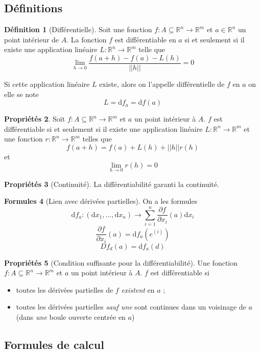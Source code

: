 \documentclass[11pt,a4paper]{article}
\theoremstyle{definition}
\newtheorem{mydef}{Définition}[section]
\newtheorem{myprop}[mydef]{Propriétés}
\newtheorem{myform}[mydef]{Formules}
\newcommand{\R}{\mathbb{R}}
\newcommand{\dif}{\mathrm{d}}
\newcommand{\fl}{\rightarrow}
\newcommand{\pa}{\partial}
\begin{document}
\subsection{Définitions}

\begin{mydef}[Différentielle] Soit une fonction $f : A \subseteq \R^n \fl \R^m$ et $a \in \R^n$ un point intérieur de $A$. La fonction $f$ est différentiable en $a$ si et seulement si il existe une application linéaire $L : \R^n \fl \R^m$ telle que
\[ \lim_{h \fl 0} \frac{f(a+h) - f(a) - L(h)}{||h||} = 0 \]

Si cette application linéaire $L$ existe, alors on l'appelle différentielle de $f$ en $a$ on elle se note
\[ L = \dif f_a = \dif f(a) \]
\end{mydef}

\begin{myprop} Soit $f : A \subseteq \R^n \fl \R^m$ et $a$ un point intérieur à $A$. $f$ est différentiable si et seulement si il existe une application linéaire $L : \R^n \fl \R^m$ et une fonction $r : \R^n \fl \R^m$ telles que
\[ f(a+h) = f(a) + L(h) + ||h|| r(h) \]
et
\[ \lim_{h \fl 0}r(h) = 0 \]
\end{myprop}

\begin{myprop}[Continuité] La différentiabilité garanti la continuité. \end{myprop}

\begin{myform}[Lien avec dérivées partielles] On a les formules
\[ \dif f_a : (\dif x_1 , \dots , \dif x_n) \fl \sum_{i=1}^n \frac{\pa f}{\pa x_i}(a) \dif x_i \]
\[ \frac{\pa f}{\pa x_i}(a) = \dif f_a(e^{(i)}) \]
\[ Df_d(a) = \dif f_a(d) \]
\end{myform}

\begin{myprop}[Condition suffisante pour la différentiabilité] Une fonction $f : A \subseteq \R^n \fl \R^m$ et $a$ un point intérieur à $A$. $f$ est différentiable si
\begin{itemize}
\item toutes les dérivées partielles de $f$ \emph{existent} en $a$ ;
\item toutes les dérivées partielles \emph{sauf une} sont continues dans un voisinage de $a$ (dans \emph{une} boule ouverte centrée en $a$)
\end{itemize}
\end{myprop}

\subsection{Formules de calcul}
\end{document}
